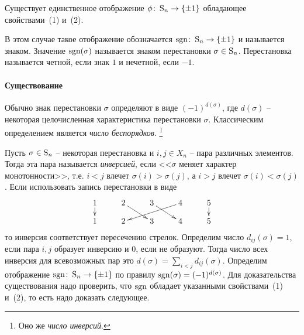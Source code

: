 \begin{claim}
Существует единственное отображение $\phi\colon \operatorname{S}_{n} \to \{\pm 1\}$ обладающее свойствами~(1) и~(2).
\end{claim}

В этом случае такое отображение обозначается $\operatorname{sgn}\colon \operatorname{S}_{n}\to \{\pm1\}$ и называется знаком.
Значение $\operatorname{sgn}(\sigma)$ называется знаком перестановки $\sigma\in\operatorname{S}_{n}$.
Перестановка называется четной, если знак $1$ и нечетной, если $-1$.



\paragraph{Существование}

Обычно знак перестановки $\sigma$ определяют в виде $(-1)^{d(\sigma)}$, где $d(\sigma)$ -- некоторая целочисленная характеристика перестановки $\sigma$.
Классическим определением является {\it число беспорядков}.%
\footnote{Оно же {\it число инверсий}.} 

Пусть $\sigma \in\operatorname{S}_{n}$ -- некоторая перестановка и $i,j\in X_n$ -- пара различных элементов.
Тогда эта пара называется {\it инверсией}, если <<$\sigma$ меняет характер монотонности>>, т.е. $i<j$ влечет $\sigma(i)>\sigma(j)$, а $i>j$ влечет $\sigma(i)<\sigma(j)$.
Если использовать запись перестановки в виде
\[
\xymatrix@R=10pt{
	{1}\ar[d]&{2}\ar[dr]&{3}\ar[dr]&{4}\ar[dll]&{5}\ar[d]\\
	{1}&{2}&{3}&{4}&{5}
}
\]
то инверсия соответствует пересечению стрелок.
Определим число $d_{ij}(\sigma) = 1$, если пара $i, j$ образует инверсию и $0$, если не образуют.
Тогда число всех инверсия для всевозможных пар это $d(\sigma) = \sum_{i < j} d_{ij}(\sigma)$.
Определим отображение $\operatorname{sgn}\colon \operatorname{S}_{n}\to \{\pm 1\}$ по правилу $\operatorname{sgn}(\sigma) = (-1)^{d(\sigma)}$.
Для доказательства существования надо проверить, что $\operatorname{sgn}$ обладает указанными свойствами~(1) и~(2), то есть надо доказать следующее.

